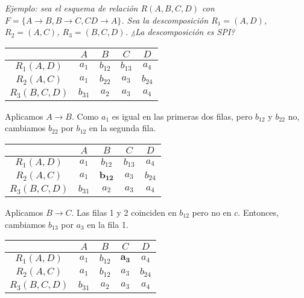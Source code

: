 \documentclass[a4paper, twoside]{article}
\begin{document}
\emph{Ejemplo: sea el esquema de relación $R(A,B,C,D)$ con $F=\{A\to B,B\to C,CD\to A\}$. Sea la descomposición $R_{1}=(A,D)$, $R_{2}=(A,C)$, $R_{3}=(B,C,D)$. ¿La descomposición es SPI?}

\begin{center}
	\begin{tabular}{|c|c|c|c|c|}
		\hline 
		 & $A$ & $B$ & $C$ & $D$\\
		\hline 
		\hline 
		$R_{1}(A,D)$ & \textbf{$a_{1}$} & \textbf{$b_{12}$} & $b_{13}$ & $a_{4}$\\
		\hline 
		$R_{2}(A,C)$ & $a_{1}$ & $b_{22}$ & $a_{3}$ & $b_{24}$\\
		\hline 
		$R_{3}(B,C,D)$ & $b_{31}$ & $a_{2}$ & $a_{3}$ & \textbf{$a_{4}$}\\
		\hline 
	\end{tabular}
\end{center}

Aplicamos $A\to B$. Como $a_{1}$ es igual en las primeras dos filas, pero $b_{12}$ y $b_{22}$ no, cambiamos $b_{22}$ por $b_{12}$ en la segunda fila.

\begin{center}
	\begin{tabular}{|c|c|c|c|c|}
		\hline 
		 & $A$ & $B$ & $C$ & $D$\\
		\hline 
		\hline 
		$R_{1}(A,D)$ & $a_{1}$ & $b_{12}$ & $b_{13}$ & $a_{4}$\\
		\hline 
		$R_{2}(A,C)$ & $a_{1}$ & $\mathbf{b_{12}}$ & $a_{3}$ & $b_{24}$\\
		\hline 
		$R_{3}(B,C,D)$ & $b_{31}$ & $a_{2}$ & $a_{3}$ & \textbf{$a_{4}$}\\
		\hline 
	\end{tabular}
\end{center}

Aplicamos $B\to C.$ Las filas 1 y 2 coinciden en $b_{12}$ pero no en $c$. Entonces, cambiamos $b_{13}$ por $a_{3}$ en la fila 1.

\begin{center}
	\begin{tabular}{|c|c|c|c|c|}
		\hline 
		 & $A$ & $B$ & $C$ & $D$\\
		\hline 
		\hline 
		$R_{1}(A,D)$ & $a_{1}$ & $b_{12}$ & $\mathbf{a_{3}}$ & $a_{4}$\\
		\hline 
		$R_{2}(A,C)$ & $a_{1}$ & $b_{12}$ & $a_{3}$ & $b_{24}$\\
		\hline 
		$R_{3}(B,C,D)$ & $b_{31}$ & $a_{2}$ & $a_{3}$ & \textbf{$a_{4}$}\\
		\hline 
	\end{tabular}
\end{center}
\end{document}
